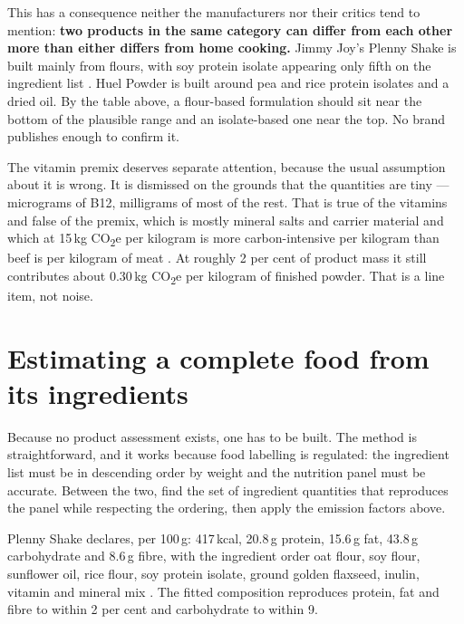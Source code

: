 \documentclass[11pt,a4paper]{article}
\newcommand{\co}{CO\textsubscript{2}e}
\begin{document}
This has a consequence neither the manufacturers nor their critics tend to mention:
\textbf{two products in the same category can differ from each other more than
either differs from home cooking.} Jimmy Joy's Plenny Shake is built mainly from
flours, with soy protein isolate appearing only fifth on the ingredient list
\cite{off-plenny}. Huel Powder is built around pea and rice protein isolates and a
dried oil. By the table above, a flour-based formulation should sit near the bottom
of the plausible range and an isolate-based one near the top. No brand publishes
enough to confirm it.

The vitamin premix deserves separate attention, because the usual assumption about
it is wrong. It is dismissed on the grounds that the quantities are tiny — micrograms
of B12, milligrams of most of the rest. That is true of the vitamins and false of the
premix, which is mostly mineral salts and carrier material and which at 15\,kg \co{}
per kilogram is more carbon-intensive per kilogram than beef is per kilogram of meat
\cite{cc-premix}. At roughly 2 per cent of product mass it still contributes about
0.30\,kg \co{} per kilogram of finished powder. That is a line item, not noise.

\section{Estimating a complete food from its ingredients}

Because no product assessment exists, one has to be built. The method is
straightforward, and it works because food labelling is regulated: the ingredient
list must be in descending order by weight and the nutrition panel must be accurate.
Between the two, find the set of ingredient quantities that reproduces the panel
while respecting the ordering, then apply the emission factors above.

Plenny Shake declares, per 100\,g: 417\,kcal, 20.8\,g protein, 15.6\,g fat, 43.8\,g
carbohydrate and 8.6\,g fibre, with the ingredient order oat flour, soy flour,
sunflower oil, rice flour, soy protein isolate, ground golden flaxseed, inulin,
vitamin and mineral mix \cite{off-plenny}. The fitted composition reproduces protein,
fat and fibre to within 2 per cent and carbohydrate to within 9.
\end{document}
